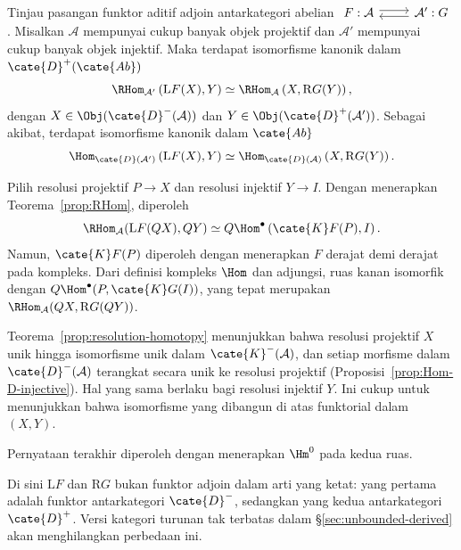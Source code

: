 \begin{teorema}\label{prop:RHom-adjoint-bounded}
	Tinjau pasangan funktor aditif adjoin antarkategori abelian
	$\begin{tikzcd}
		F: \mathcal{A} \arrow[r, shift left] & \mathcal{A}' \arrow[l, shift left] : G
	\end{tikzcd}$.
	Misalkan $\mathcal{A}$ mempunyai cukup banyak objek projektif dan
	$\mathcal{A}'$ mempunyai cukup banyak objek injektif. Maka terdapat
	isomorfisme kanonik dalam $\cate{D}^+(\cate{Ab})$
	\[ \RHom_{\mathcal{A'}}\left(\mathrm{L}F(X), Y\right) \simeq \RHom_{\mathcal{A}}\left(X, \mathrm{R}G(Y) \right), \]
	dengan $X\in\Obj(\cate{D}^-(\mathcal{A}))$ dan
	$Y\in\Obj(\cate{D}^+(\mathcal{A}'))$. Sebagai akibat, terdapat
	isomorfisme kanonik dalam $\cate{Ab}$
	\[ \Hom_{\cate{D}(\mathcal{A'})}\left(\mathrm{L}F(X), Y\right) \simeq \Hom_{\cate{D}(\mathcal{A})}\left(X, \mathrm{R}G(Y) \right). \]
\end{teorema}
\begin{bukti}
	Pilih resolusi projektif $P\to X$ dan resolusi injektif $Y\to I$.
	Dengan menerapkan Teorema~\ref{prop:RHom}, diperoleh
	\[ \RHom_{\mathcal{A}}(\mathrm{L}F(QX), QY) \simeq Q\Hom^\bullet\left( \cate{K}F(P), I \right). \]
	Namun, $\cate{K}F(P)$ diperoleh dengan menerapkan $F$ derajat demi derajat
	pada kompleks. Dari definisi kompleks $\Hom$ dan adjungsi, ruas kanan
	isomorfik dengan $Q\Hom^\bullet(P,\cate{K}G(I))$, yang tepat merupakan
	$\RHom_{\mathcal{A}}(QX,\mathrm{R}G(QY))$.

	Teorema~\ref{prop:resolution-homotopy} menunjukkan bahwa resolusi projektif
	$X$ unik hingga isomorfisme unik dalam $\cate{K}^-(\mathcal{A})$, dan
	setiap morfisme dalam $\cate{D}^-(\mathcal{A})$ terangkat secara unik ke
	resolusi projektif (Proposisi~\ref{prop:Hom-D-injective}). Hal yang sama
	berlaku bagi resolusi injektif $Y$. Ini cukup untuk menunjukkan bahwa
	isomorfisme yang dibangun di atas funktorial dalam $(X,Y)$.

	Pernyataan terakhir diperoleh dengan menerapkan $\Hm^0$ pada kedua ruas.
\end{bukti}

Di sini $\mathrm{L}F$ dan $\mathrm{R}G$ bukan funktor adjoin dalam arti yang
ketat: yang pertama adalah funktor antarkategori $\cate{D}^-$, sedangkan yang
kedua antarkategori $\cate{D}^+$. Versi kategori turunan tak terbatas dalam
\S\ref{sec:unbounded-derived} akan menghilangkan perbedaan ini.
